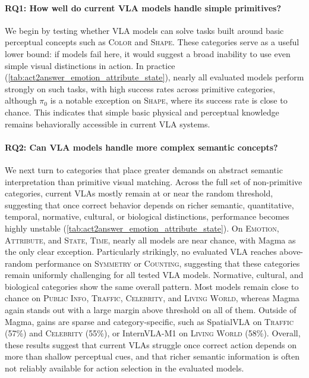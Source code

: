 \documentclass{llmxive}
\begin{document}
\paragraph{RQ1: How well do current VLA models handle simple primitives?}
We begin by testing whether VLA models can solve tasks built around basic perceptual concepts such as \textsc{Color} and \textsc{Shape}. These categories serve as a useful lower bound: if models fail here, it would suggest a broad inability to use even simple visual distinctions in action. In practice (\autoref{tab:act2answer_emotion_attribute_state}), nearly all evaluated models perform strongly on such tasks, with high success rates across primitive categories, although $\pi_0$ is a notable exception on \textsc{Shape}, where its success rate is close to chance. This indicates that simple basic physical and perceptual knowledge remains behaviorally accessible in current VLA systems.

\paragraph{RQ2: Can VLA models handle more complex semantic concepts?}
We next turn to categories that place greater demands on abstract semantic interpretation than primitive visual matching. Across the full set of non-primitive categories, current VLAs mostly remain at or near the random threshold, suggesting that once correct behavior depends on richer semantic, quantitative, temporal, normative, cultural, or biological distinctions, performance becomes highly unstable (\autoref{tab:act2answer_emotion_attribute_state}). On \textsc{Emotion}, \textsc{Attribute}, and \textsc{State}, \textsc{Time}, nearly all models are near chance, with Magma as the only clear exception. Particularly strikingly, no evaluated VLA reaches above-random performance on \textsc{Symmetry} or \textsc{Counting}, suggesting that these categories remain uniformly challenging for all tested VLA models. Normative, cultural, and biological categories show the same overall pattern. Most models remain close to chance on \textsc{Public Info}, \textsc{Traffic}, \textsc{Celebrity}, and \textsc{Living World}, whereas Magma again stands out with a large margin above threshold on all of them. Outside of Magma, gains are sparse and category-specific, such as SpatialVLA on \textsc{Traffic} (57\%) and \textsc{Celebrity} (55\%), or InternVLA-M1 on \textsc{Living World} (58\%). Overall, these results suggest that current VLAs struggle once correct action depends on more than shallow perceptual cues, and that richer semantic information is often not reliably available for action selection in the evaluated models.
\end{document}
